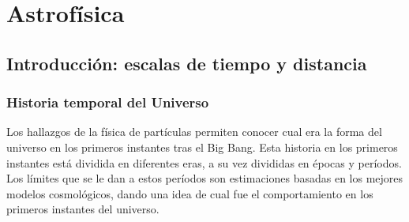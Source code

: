 \chapter{Astrofísica}




\section{Introducción: escalas de tiempo y distancia}

\subsection{Historia temporal del Universo}

Los hallazgos de la física de partículas permiten conocer cual era la forma del universo en los primeros instantes tras el Big Bang. Esta historia en los primeros instantes está dividida en diferentes eras, a su vez divididas en épocas y períodos. Los límites que se le dan a estos períodos son estimaciones basadas en los mejores modelos cosmológicos, dando una idea de cual fue el comportamiento en los primeros instantes del universo.

